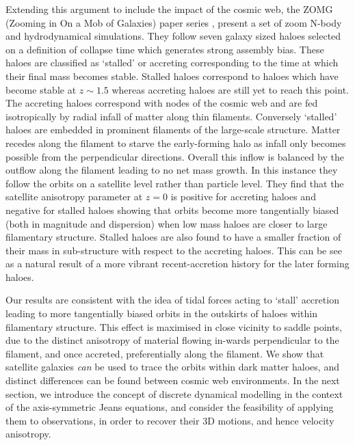 Extending this argument to include the impact of the cosmic web, the ZOMG (Zooming in On a Mob of Galaxies) paper series \cite{ZOMGI,ZOMGII,ZOMGiii}, present a set of zoom N-body and hydrodynamical simulations. They follow seven galaxy sized haloes selected on a definition of collapse time which generates strong assembly bias. These haloes are classified as `stalled' or accreting corresponding to the time at which their final mass becomes stable. Stalled haloes correspond to haloes which have become stable at $z \sim 1.5$ whereas accreting haloes are still yet to reach this point. 
The accreting haloes correspond with nodes of the cosmic web and are fed isotropically by radial infall of matter along thin filaments. Conversely `stalled' haloes are embedded in prominent filaments of the large-scale structure. Matter recedes along the filament to starve the early-forming halo as infall only becomes possible from the perpendicular directions. Overall this inflow is balanced by the outflow along the filament leading to no net mass growth. In this instance they follow the orbits on a satellite level rather than particle level. They find that the satellite anisotropy parameter at $z = 0$ is positive for accreting haloes and negative for stalled haloes showing that orbits become more tangentially biased (both in magnitude and dispersion) when low mass haloes are closer to large filamentary structure. Stalled haloes are also found to have a smaller fraction of their mass in sub-structure with respect to the accreting haloes. This can be see as a natural result of a more vibrant recent-accretion history for the later forming haloes. 

Our results are consistent with the idea of tidal forces acting to `stall' accretion leading to more tangentially biased orbits in the outskirts of haloes within filamentary structure. This effect is maximised in close vicinity to saddle points, due to the distinct anisotropy of material flowing in-wards perpendicular to the filament, and once accreted, preferentially along the filament. We show that satellite galaxies \textit{can} be used to trace the orbits within dark matter haloes, and distinct differences can be found between cosmic web environments. In the next section, we introduce the concept of discrete dynamical modelling in the context of the axis-symmetric Jeans equations, and consider the feasibility of applying them to observations, in order to recover their 3D motions, and hence velocity anisotropy.

